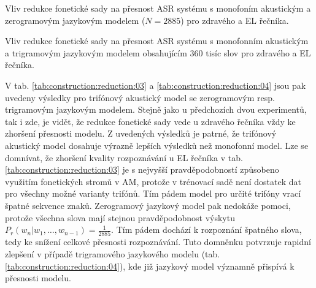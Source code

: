 \begin{table}[htpb]
  \centering
  \def\arraystretch{1.5}
  \caption{Vliv redukce fonetické sady na přesnost ASR systému s monofoním akustickým a zerogramovým jazykovým modelem ($N=2885$) pro zdravého a EL řečníka.}
  \label{tab:construction:reduction:01}
\end{table}

\begin{table}[htpb]
  \centering
  \def\arraystretch{1.5}
  \caption{Vliv redukce fonetické sady na přesnost ASR systému s monofonním akustickým a trigramovým jazykovým modelem obsahujícím 360 tisíc slov pro zdravého a EL řečníka.}
  \label{tab:construction:reduction:02}
\end{table}


V tab. \ref{tab:construction:reduction:03} a \ref{tab:construction:reduction:04} jsou pak uvedeny výsledky pro trifónový akustický model se zerogramovým resp. trigramovým jazykovým modelem.
Stejně jako u předchozích dvou experimentů, tak i zde, je vidět, že redukce fonetické sady vede u zdravého řečníka vždy ke zhoršení přesnosti modelu.
Z uvedených výsledků je patrné, že trifónový akustický model dosahuje výrazně lepších výsledků než monofonní model.
Lze se domnívat, že zhoršení kvality rozpoznávání u EL řečníka v tab. \ref{tab:construction:reduction:03} je s nejvyšší pravděpodobností způsobeno využitím fonetických stromů v AM, protože v trénovací sadě není dostatek dat pro všechny možné varianty trifónů.
Tím pádem model pro určité trifóny vrací špatné sekvence znaků.
Zerogramový jazykový model pak nedokáže pomoci, protože všechna slova mají stejnou pravděpodobnost výskytu $P_r(w_n|w_1,\dots,w_{n-1}) = \frac{1}{2885}$.
Tím pádem dochází k rozpoznání špatného slova, tedy ke snížení celkové přesnosti rozpoznávání.
Tuto domněnku potvrzuje rapidní zlepšení v případě trigramového jazykového modelu (tab. \ref{tab:construction:reduction:04}), kde již jazykový model významně přispívá k přesnosti modelu.

